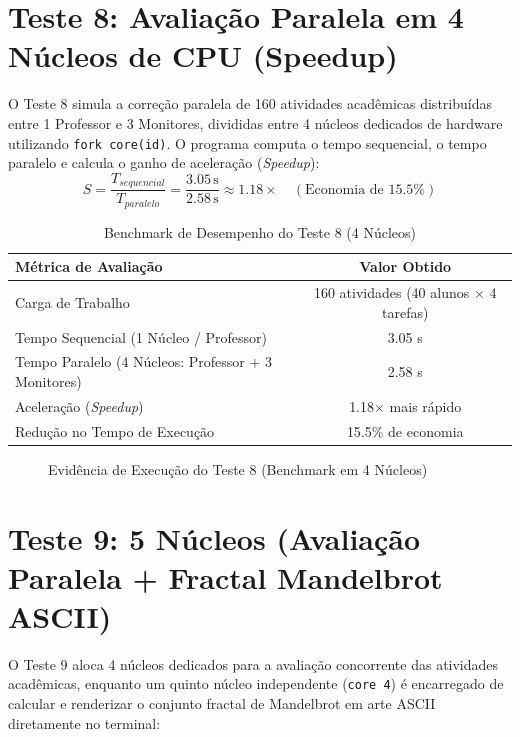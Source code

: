 \section{Teste 8: Avaliação Paralela em 4 Núcleos de CPU (Speedup)}
O Teste 8 simula a correção paralela de 160 atividades acadêmicas distribuídas entre 1 Professor e 3 Monitores, divididas entre 4 núcleos dedicados de hardware utilizando \texttt{fork core(id)}. O programa computa o tempo sequencial, o tempo paralelo e calcula o ganho de aceleração (\textit{Speedup}):
$$S = \frac{T_{sequencial}}{T_{paralelo}} = \frac{3.05\,\text{s}}{2.58\,\text{s}} \approx 1.18\times \quad (\text{Economia de } 15.5\%)$$

\begin{table}[htbp]
\centering
\caption{Benchmark de Desempenho do Teste 8 (4 Núcleos)}
\label{tab:bench_teste8}
\begin{tabular}{lc}
\toprule
Métrica de Avaliação & Valor Obtido \\
\midrule
Carga de Trabalho & 160 atividades (40 alunos $\times$ 4 tarefas) \\
Tempo Sequencial (1 Núcleo / Professor) & 3.05 s \\
Tempo Paralelo (4 Núcleos: Professor + 3 Monitores) & 2.58 s \\
Aceleração (\textit{Speedup}) & 1.18$\times$ mais rápido \\
Redução no Tempo de Execução & 15.5\% de economia \\
\bottomrule
\end{tabular}
\end{table}

\begin{figure}[htbp]
    \centering
    \caption{Evidência de Execução do Teste 8 (Benchmark em 4 Núcleos)}
    \label{fig:teste8_print}
\end{figure}

\section{Teste 9: 5 Núcleos (Avaliação Paralela + Fractal Mandelbrot ASCII)}
O Teste 9 aloca 4 núcleos dedicados para a avaliação concorrente das atividades acadêmicas, enquanto um quinto núcleo independente (\texttt{core 4}) é encarregado de calcular e renderizar o conjunto fractal de Mandelbrot em arte ASCII diretamente no terminal:

